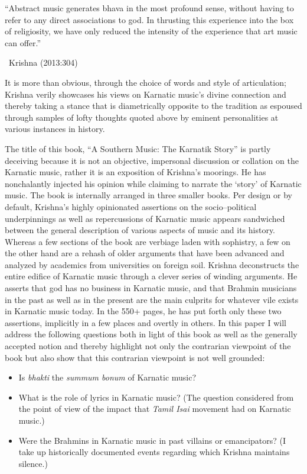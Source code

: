 \begin{myquote}
“Abstract music generates bhava in the most profound sense, without having to refer to any direct associations to god. In thrusting this experience into the box of religiosity, we have only reduced the intensity of the experience that art music can offer.” 

~\hfill Krishna (2013:304)
\end{myquote}

It is more than obvious, through the choice of words and style of articulation; Krishna verily showcases his views on Karnatic music’s divine connection and thereby taking a stance that is diametrically opposite to the tradition as espoused through samples of lofty thoughts quoted above by eminent personalities at various instances in history.

The title of this book, “A Southern Music: The Karnatik Story” is partly deceiving because it is not an objective, impersonal discussion or collation on the Karnatic music, rather it is an exposition of Krishna’s moorings. He has nonchalantly injected his opinion while claiming to narrate the ‘story’ of Karnatic music. The book is internally arranged in three smaller books. Per design or by default, Krishna’s highly opinionated assertions on the socio–political underpinnings as well as repercussions of Karnatic music appears sandwiched between the general description of various aspects of music and its history. Whereas a few sections of the book are verbiage laden with sophistry, a few on the other hand are a rehash of older arguments that have been advanced and analyzed by academics from universities on foreign soil. Krishna deconstructs the entire edifice of Karnatic music through a clever series of winding arguments. He asserts that god has no business in Karnatic music, and that Brahmin musicians in the past as well as in the present are the main culprits for whatever vile exists in Karnatic music today. In the 550+ pages, he has put forth only these two assertions, implicitly in a few places and overtly in others. In this paper I will address the following questions both in light of this book as well as the generally accepted notion and thereby highlight not only the contrarian viewpoint of the book but also show that this contrarian viewpoint is not well grounded:

\begin{itemize}
\item Is \textit{bhakti} the \textit{summum bonum} of Karnatic music?

 \item What is the role of lyrics in Karnatic music? (The question considered from the point of view of the impact that \textit{Tamil Isai} movement had on Karnatic music.)

 \item Were the Brahmins in Karnatic music in past villains or emancipators? (I take up historically documented events regarding which Krishna maintains silence.)

\end{itemize}

